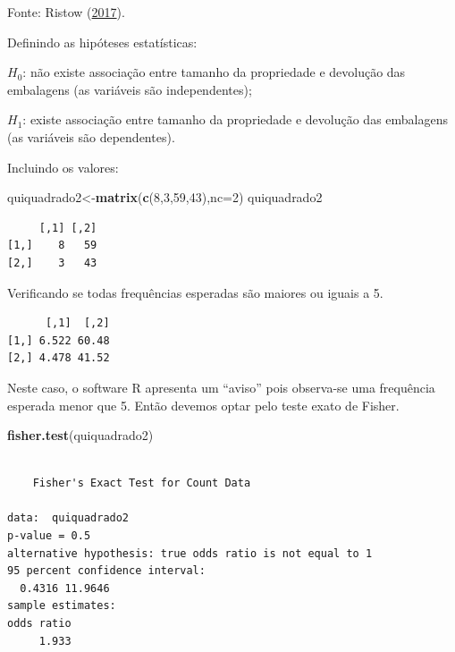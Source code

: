 \documentclass[12pt,brazil,oneside]{book}
\newenvironment{Shaded}{\begin{snugshade}}{\end{snugshade}}
\newcommand{\DataTypeTok}[1]{\textcolor[rgb]{0.13,0.29,0.53}{#1}}
\newcommand{\DecValTok}[1]{\textcolor[rgb]{0.00,0.00,0.81}{#1}}
\newcommand{\KeywordTok}[1]{\textcolor[rgb]{0.13,0.29,0.53}{\textbf{#1}}}
\newcommand{\NormalTok}[1]{#1}
\newcommand{\OperatorTok}[1]{\textcolor[rgb]{0.81,0.36,0.00}{\textbf{#1}}}
\begin{document}
Fonte: Ristow (\protect\hyperlink{ref-Ristow2017}{2017}).

Definindo as hipóteses estatísticas:

\(H_0\): não existe associação entre tamanho da propriedade e devolução das embalagens (as variáveis são independentes);

\(H_1\): existe associação entre tamanho da propriedade e devolução das embalagens (as variáveis são dependentes).

Incluindo os valores:

\begin{Shaded}
\begin{Highlighting}[]
\NormalTok{quiquadrado2<-}\KeywordTok{matrix}\NormalTok{(}\KeywordTok{c}\NormalTok{(}\DecValTok{8}\NormalTok{,}\DecValTok{3}\NormalTok{,}\DecValTok{59}\NormalTok{,}\DecValTok{43}\NormalTok{),}\DataTypeTok{nc=}\DecValTok{2}\NormalTok{)}
\NormalTok{quiquadrado2}
\end{Highlighting}
\end{Shaded}

\begin{verbatim}
     [,1] [,2]
[1,]    8   59
[2,]    3   43
\end{verbatim}

Verificando se todas frequências esperadas são maiores ou iguais a 5.

\begin{Shaded}
\end{Shaded}

\begin{verbatim}
      [,1]  [,2]
[1,] 6.522 60.48
[2,] 4.478 41.52
\end{verbatim}

Neste caso, o software R apresenta um ``aviso'' pois observa-se uma frequência esperada menor que 5. Então devemos optar pelo teste exato de Fisher.

\begin{Shaded}
\begin{Highlighting}[]
\KeywordTok{fisher.test}\NormalTok{(quiquadrado2)}
\end{Highlighting}
\end{Shaded}

\begin{verbatim}

    Fisher's Exact Test for Count Data

data:  quiquadrado2
p-value = 0.5
alternative hypothesis: true odds ratio is not equal to 1
95 percent confidence interval:
  0.4316 11.9646
sample estimates:
odds ratio 
     1.933 
\end{verbatim}
\end{document}

